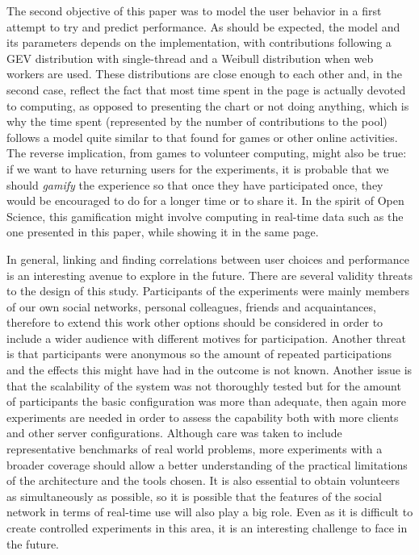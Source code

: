 \documentclass{sig-alternate}
\begin{document}
The second objective of this paper was to model the user behavior in a
first attempt to try and predict performance. As should be expected,
the model and its parameters depends on the implementation, with contributions following
a GEV distribution with single-thread and a
Weibull distribution when web workers are used. These distributions are
close enough to each other and, in the second case, reflect the fact
that most time spent in the page is actually devoted to computing, as
opposed to presenting the chart or not doing anything,
which is why the time spent (represented by the number of
contributions to the pool) follows a model quite similar to that found
for games or other online activities. The reverse implication, from
games to volunteer computing,  might also be true: if we
want to have returning users for the experiments, it is probable that
we should {\em gamify} the experience so that once they have participated
once, they would be encouraged to do for a longer time or to share
it. In the spirit of Open Science, this 
gamification might involve computing in real-time data such as the one
presented in this paper, while showing it in the same page. 

In general, linking and finding correlations between user choices and
performance is an interesting avenue to explore in the future. %
There are several validity threats to the design of this study.
Participants of the experiments were mainly members of our 
own social networks, personal colleagues, friends 
and acquaintances, therefore to extend this work other options 
should be considered in order to include 
a wider audience with different motives for participation.
Another threat is that participants were anonymous so the amount of repeated 
participations and the effects this might have had in the outcome is not
known. Another issue is that the scalability of the system was not thoroughly tested
but for the amount of participants the basic configuration 
was more than adequate, then again more experiments are needed in order
to assess the capability both with more clients and other server
configurations. Although care was taken to include representative benchmarks
of real world problems, more experiments with a broader coverage 
should allow a better understanding of the practical limitations of
the architecture and the tools chosen.
It is also essential to obtain volunteers as
simultaneously as possible, so it is possible that the features of the
social network in terms of real-time use will also play a big
role. Even as it is difficult to create controlled experiments in this
area, it is an interesting challenge to face in the future. %
\end{document}

